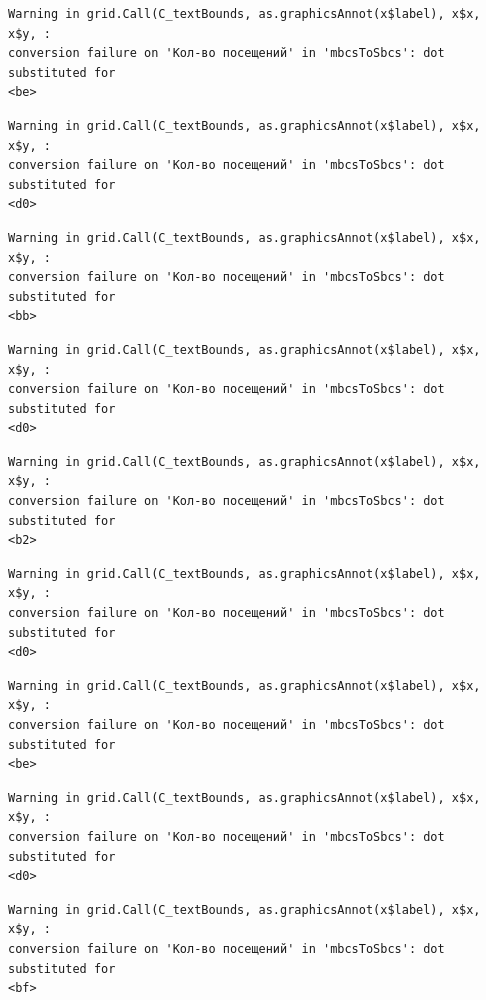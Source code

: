 \documentclass[
  letterpaper,
  DIV=11,
  numbers=noendperiod]{scrartcl}
\begin{document}
\begin{verbatim}
Warning in grid.Call(C_textBounds, as.graphicsAnnot(x$label), x$x, x$y, :
conversion failure on 'Кол-во посещений' in 'mbcsToSbcs': dot substituted for
<be>
\end{verbatim}

\begin{verbatim}
Warning in grid.Call(C_textBounds, as.graphicsAnnot(x$label), x$x, x$y, :
conversion failure on 'Кол-во посещений' in 'mbcsToSbcs': dot substituted for
<d0>
\end{verbatim}

\begin{verbatim}
Warning in grid.Call(C_textBounds, as.graphicsAnnot(x$label), x$x, x$y, :
conversion failure on 'Кол-во посещений' in 'mbcsToSbcs': dot substituted for
<bb>
\end{verbatim}

\begin{verbatim}
Warning in grid.Call(C_textBounds, as.graphicsAnnot(x$label), x$x, x$y, :
conversion failure on 'Кол-во посещений' in 'mbcsToSbcs': dot substituted for
<d0>
\end{verbatim}

\begin{verbatim}
Warning in grid.Call(C_textBounds, as.graphicsAnnot(x$label), x$x, x$y, :
conversion failure on 'Кол-во посещений' in 'mbcsToSbcs': dot substituted for
<b2>
\end{verbatim}

\begin{verbatim}
Warning in grid.Call(C_textBounds, as.graphicsAnnot(x$label), x$x, x$y, :
conversion failure on 'Кол-во посещений' in 'mbcsToSbcs': dot substituted for
<d0>
\end{verbatim}

\begin{verbatim}
Warning in grid.Call(C_textBounds, as.graphicsAnnot(x$label), x$x, x$y, :
conversion failure on 'Кол-во посещений' in 'mbcsToSbcs': dot substituted for
<be>
\end{verbatim}

\begin{verbatim}
Warning in grid.Call(C_textBounds, as.graphicsAnnot(x$label), x$x, x$y, :
conversion failure on 'Кол-во посещений' in 'mbcsToSbcs': dot substituted for
<d0>
\end{verbatim}

\begin{verbatim}
Warning in grid.Call(C_textBounds, as.graphicsAnnot(x$label), x$x, x$y, :
conversion failure on 'Кол-во посещений' in 'mbcsToSbcs': dot substituted for
<bf>
\end{verbatim}
\end{document}
